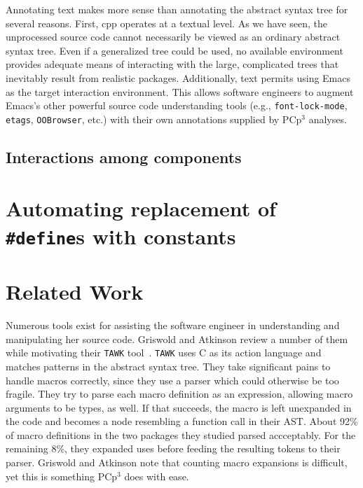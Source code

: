 \documentclass{article}
\newcommand{\pcp}{\mbox{\textsf{PCp}$^3$}}
\newcommand{\Cpp}{\mbox{\textsf{cpp}}}
\newcommand{\C}{\mbox{\textsf{C}}}
\newcommand{\ppd}[1]{\texttt{\##1}}
\newcommand{\eg}{e.g.,}
\newcommand{\etc}{etc}  %
\begin{document}
Annotating text makes more sense than annotating the abstract syntax
tree for several reasons.  First, \Cpp{} operates at a textual level.
As we have seen, the unprocessed source code cannot necessarily be
viewed as an ordinary abstract syntax tree.  Even if a generalized tree
could be used, no available environment provides adequate means of
interacting with the large, complicated trees that inevitably result
from realistic packages.  Additionally, text permits using Emacs as the
target interaction environment. This allows software engineers to
augment Emacs's other powerful source code understanding tools (\eg{}
\texttt{font-lock-mode}, \texttt{etags}, \texttt{OOBrowser}, \etc{}.)
with their own annotations supplied by \pcp{} analyses.


\subsection{Interactions among components}



\section{Automating replacement of \ppd{define}s with constants}
\label{sec:xform}




\section{Related Work}
\label{sec:related}
Numerous tools exist for assisting the software engineer in
understanding and manipulating her source code.  Griswold and Atkinson
review a number of them while motivating their \texttt{TAWK} tool~\cite{Griswold96}.
\texttt{TAWK} uses \C{} as its action language and matches patterns in
the abstract syntax tree.  They take significant pains to handle macros
correctly, since they use a parser which could otherwise be too
fragile.  They try to parse each macro definition as an expression,
allowing macro arguments to be types, as well.  If that succeeds, the
macro is left unexpanded in the code and becomes a node resembling a
function call in their AST.  About 92\% of macro definitions in the two packages
they studied parsed accceptably.  For the remaining 8\%, they expanded
uses before feeding the resulting tokens to their parser.  Griswold and
Atkinson note that counting macro expansions is difficult, yet this is
something \pcp{} does with ease.
\end{document}
